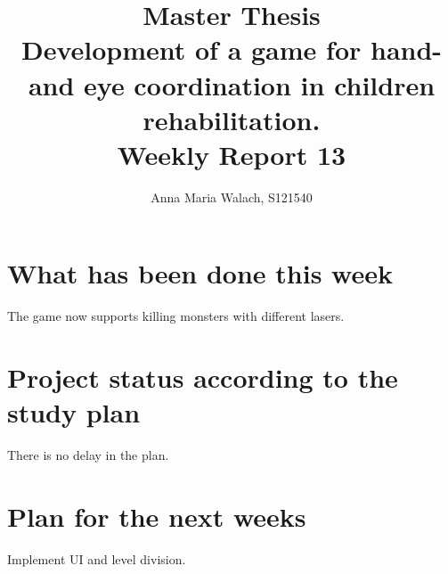 \documentclass[10pt,a4paper]{article}
\title{{Master Thesis\\[0.5em]}
       {\bf \huge Development of a game for hand- and eye coordination in children rehabilitation.\\[0.5em]}
       {\bf Weekly Report 13}}
\author{Anna Maria Walach, S121540}
\begin{document}
\maketitle

\section*{What has been done this week}
The game now supports killing monsters with different lasers. 

\section*{Project status according to the study plan}
There is no delay in the plan.

\section*{Plan for the next weeks}
Implement UI and level division. 



\end{document}
